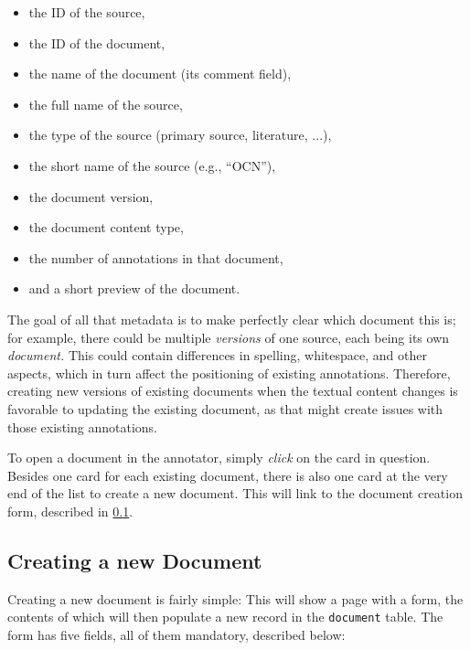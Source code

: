 \begin{itemize}
  \item the ID of the source,
  \item the ID of the document,
  \item the name of the document (its comment field),
  \item the full name of the source,
  \item the type of the source (primary source, literature, ...),
  \item the short name of the source (e.g., \enquote{OCN}),
  \item the document version,
  \item the document content type,
  \item the number of annotations in that document,
  \item and a short preview of the document.
\end{itemize}

The goal of all that metadata is to make perfectly clear which document this is;
for example, there could be multiple \emph{versions} of one source, each being its own \emph{document.}
This could contain differences in spelling, whitespace, and other aspects, which in turn affect the positioning of existing annotations.
Therefore, creating new versions of existing documents when the textual content changes is favorable to updating the existing document, as that might create issues with those existing annotations.

To open a document in the annotator, simply \emph{click} on the card in question.
Besides one card for each existing document, there is also one card at the very end of the list to create a new document.
This will link to the document creation form, described in \cref{sec:document-creation}.


\subsection{Creating a new Document}
\label{sec:document-creation}

Creating a new document is fairly simple:
This will show a page with a form, the contents of which will then populate a new record in the \verb!document! table.
The form has five fields, all of them mandatory, described below:

